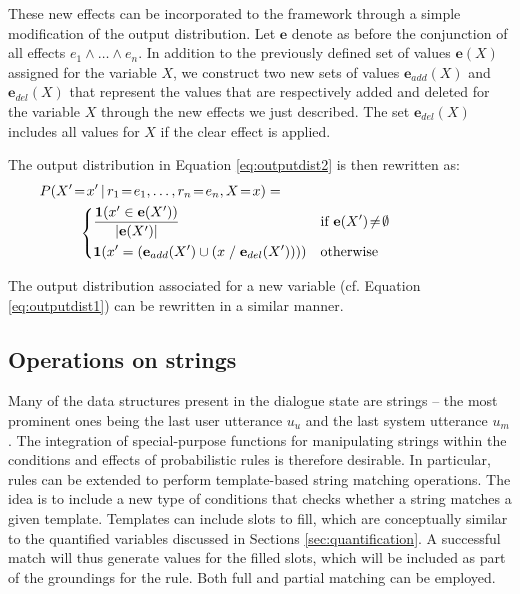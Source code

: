 These new effects can be incorporated to the framework through a simple modification of the output distribution. Let $\mathbf{e}$ denote as before the conjunction of all effects $e_1 \land \dots \land e_n$. In addition to the previously defined set of values $\mathbf{e}(X)$ assigned for the variable $X$, we construct two new sets of values $\mathbf{e}_{add}(X)$ and $\mathbf{e}_{del}(X)$ that represent the values that are respectively added and deleted for the variable $X$ through the new effects we just described. The set $\mathbf{e}_{del}(X)$ includes all values for $X$ if the clear effect is applied. 

The output distribution in Equation \eqref{eq:outputdist2} is then rewritten as:
\begin{align}
&P(X'\!=\!x' \, | \, r_1\!=\!e_1, \dots, r_n\!=\!e_n, X\!=\!x) = \hspace{5cm} \nonumber \\ & \; \; \; \; \; \; \; \; \; \;  \begin{dcases} 
\frac{ \mathbf{1}(x' \in {\mathbf{e}(X')})} { |\mathbf{e}(X')| }  & \text{if } \mathbf{e}(X')\!\neq\!\emptyset \\
\mathbf{1}(x' = \left(\mathbf{e}_{add}(X') \cup \left(x \; / \; \mathbf{e}_{del}(X')\right)\right)) & \text{otherwise} \\
\end{dcases}\label{eq:outputdist4}
\end{align} 

The output distribution associated for a new variable (cf. Equation \eqref{eq:outputdist1}) can be rewritten in a similar manner.




\subsection{Operations on strings}

Many of the data structures present in the dialogue state are strings -- the most prominent ones being the last user utterance $u_u$ and the last system utterance $u_m$. The integration of special-purpose functions for manipulating strings within the conditions and effects of probabilistic rules is therefore desirable. In particular, rules can be extended to perform template-based string matching operations.  The idea is to include a new type of conditions that checks whether a string matches a given template. Templates can include slots to fill, which are conceptually similar to the quantified variables discussed in Sections \ref{sec:quantification}. A successful match will thus generate values for the filled slots, which will be included as part of the groundings for the rule.  Both full and partial matching can be employed.


